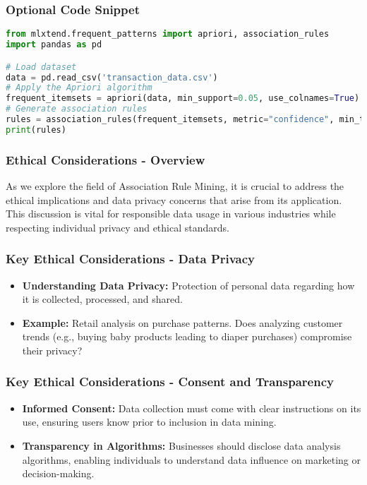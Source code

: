 \documentclass{beamer}
\begin{document}
\begin{frame}[fragile]
    \frametitle{Optional Code Snippet}
    \begin{lstlisting}[language=Python]
from mlxtend.frequent_patterns import apriori, association_rules
import pandas as pd

# Load dataset
data = pd.read_csv('transaction_data.csv')
# Apply the Apriori algorithm
frequent_itemsets = apriori(data, min_support=0.05, use_colnames=True)
# Generate association rules
rules = association_rules(frequent_itemsets, metric="confidence", min_threshold=0.6)
print(rules)
    \end{lstlisting}
\end{frame}

\begin{frame}[fragile]
    \frametitle{Ethical Considerations - Overview}
    As we explore the field of Association Rule Mining, it is crucial to address the ethical implications and data privacy concerns that arise from its application. 
    This discussion is vital for responsible data usage in various industries while respecting individual privacy and ethical standards.
\end{frame}

\begin{frame}[fragile]
    \frametitle{Key Ethical Considerations - Data Privacy}
    \begin{itemize}
        \item \textbf{Understanding Data Privacy:} Protection of personal data regarding how it is collected, processed, and shared.
        
        \item \textbf{Example:} Retail analysis on purchase patterns. 
        Does analyzing customer trends (e.g., buying baby products leading to diaper purchases) compromise their privacy?
    \end{itemize}
\end{frame}

\begin{frame}[fragile]
    \frametitle{Key Ethical Considerations - Consent and Transparency}
    \begin{itemize}
        \item \textbf{Informed Consent:} Data collection must come with clear instructions on its use, ensuring users know prior to inclusion in data mining.
        
        \item \textbf{Transparency in Algorithms:} Businesses should disclose data analysis algorithms, enabling individuals to understand data influence on marketing or decision-making.
    \end{itemize}
\end{frame}
\end{document}
